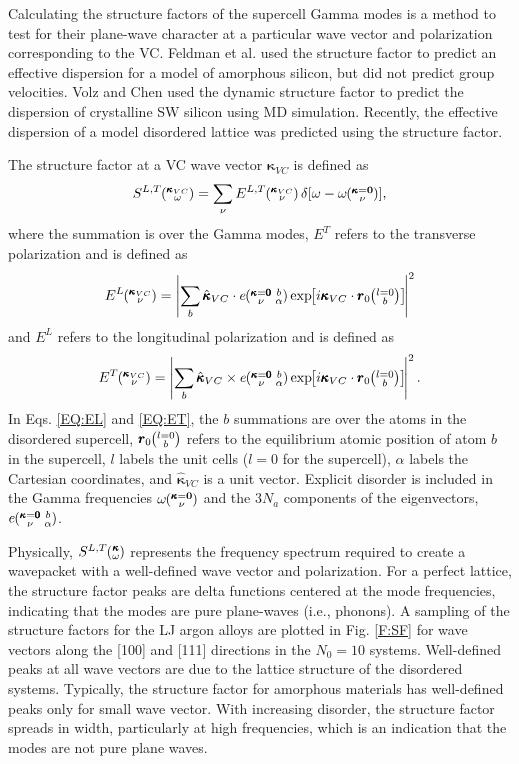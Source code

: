 \documentclass[12pt,twocolumn,iop]{/usr/share/texmf/tex/latex/iop/iopart}[/usr/share/texmf/tex/latex/iop/]
\newcommand{\EXP}[1]{\exp\mspace{-5.0mu}\left[#1\right]\mspace{-3.0mu}}
\newcommand{\ab}[2]{\mspace{-4.0mu}\left(\mspace{-8.0mu}
\begin{smallmatrix}&\ifthenelse{\equal{#1}{}}{a}{#1} \\&\ifthenelse
{\equal{#2}{}}{b}{#2}\end{smallmatrix}\mspace{-3.0mu}\right)}
\newcommand{\kgvba}{\mspace{-4.0mu}\left(\mspace{-8.0mu}
\begin{smallmatrix} &\pmb{\kappa}=\pmb{0} &b \\ &\nu 
&\alpha\end{smallmatrix}\mspace{-3.0mu}\right)}
\newcommand{\kvcv}{\mspace{-4.0mu}\left(\mspace{-8.0mu}
\begin{smallmatrix}&\pmb{\kappa}_{VC} \\&\nu\end{smallmatrix}
\mspace{-3.0mu}\right)}
\newcommand{\kgv}{\mspace{-4.0mu}\left(\mspace{-8.0mu}
\begin{smallmatrix}&\pmb{\kappa}=\mathbf{0} \\&\nu\end{smallmatrix}
\mspace{-3.0mu}\right)}
\newcommand{\kw}{\mspace{-4.0mu}\left(\mspace{-8.0mu}
\begin{smallmatrix}&\pmb{\kappa} \\&\omega\end{smallmatrix}
\mspace{-3.0mu}\right)}
\newcommand{\kvcw}{\mspace{-4.0mu}\left(\mspace{-8.0mu}
\begin{smallmatrix}&\pmb{\kappa}_{VC} \\&\omega\end{smallmatrix}
\mspace{-3.0mu}\right)}
\begin{document}
Calculating the structure factors of the supercell Gamma   
modes is a method to test for their plane-wave 
character at a particular wave vector and 
polarization corresponding to the VC. 
\cite{allen_diffusons_1999,feldman_numerical_1999} 
Feldman et al. used the structure factor to predict an effective 
dispersion for a model of amorphous silicon, but did not predict 
group velocities.\cite{feldman_numerical_1999} 
Volz and Chen used the dynamic structure factor to predict the
dispersion of crystalline SW silicon using MD simulation.
\cite{volz_molecular-dynamics_2000} Recently, the effective dispersion 
of a model disordered lattice was predicted using the structure factor.
\cite{beltukov_ioffe_2013}

The structure factor at a VC wave vector 
$\pmb{\kappa}_{VC}$ is defined as\cite{allen_diffusons_1999} 
\begin{equation}\label{EQ:SLT}
S^{L,T}\kvcw = 
\sum_{\nu} E^{L,T}\kvcv
\delta [\omega-\omega\kgv],
\end{equation}
where the summation is over the Gamma modes, $E^{T}$ refers 
to the transverse polarization and is defined as
\begin{equation}\label{EQ:EL}
E^L\kvcv = 
\left|
\sum_{b} 
\hat{\pmb{\kappa}}_{VC} \cdot e\kgvba 
\EXP{i\pmb{\kappa}_{VC}\cdot\pmb{r}_0\ab{l=0}{b}} 
\right|^2
\end{equation}
and $E^{L}$ refers to the longitudinal polarization and is defined as
\begin{equation}\label{EQ:ET}
E^T\kvcv = 
\left|
\sum_{b} 
\hat{\pmb{\kappa}}_{VC} \times e\kgvba 
\EXP{i\pmb{\kappa}_{VC}\cdot\pmb{r}_0\ab{l=0}{b}} 
\right|^2.
\end{equation}
In Eqs. \eqref{EQ:EL} and \eqref{EQ:ET}, the $b$ summations are 
over the atoms in the disordered supercell, 
$\pmb{r}_0\ab{l=0}{b}$ refers to the equilibrium atomic position of 
atom $b$ in the supercell, $l$ labels the unit cells 
($l=0$ for the supercell), 
$\alpha$ labels the Cartesian coordinates, and 
$\hat{\pmb{\kappa}}_{VC}$ is a unit vector.  
Explicit disorder is included in the Gamma frequencies 
$\omega\kgv$ and the $3N_a$ components of the eigenvectors, $e\kgvba$.

Physically, $S^{L,T}\kw$ represents  
the frequency spectrum required to create a wavepacket with a 
well-defined wave vector and polarization.
\cite{allen_diffusons_1999,feldman_numerical_1999,green_density_2011} 
For a perfect lattice, the 
structure factor peaks are delta functions centered at the mode 
frequencies, indicating that the modes are pure plane-waves 
(i.e., phonons). 
A sampling of the structure factors for the LJ argon alloys 
are plotted in Fig. \ref{F:SF} for wave vectors along the [100] and [111] 
directions in the $N_0=10$ systems.\cite{vc_fn1}  
Well-defined peaks 
at all wave vectors are due to the 
lattice structure of the disordered systems. 
Typically, the structure factor for amorphous materials has well-defined 
peaks only for small wave vector.
\cite{allen_diffusons_1999,feldman_numerical_1999} 
With increasing disorder, the structure factor spreads in width,  
particularly at high frequencies, which is an indication that the 
modes are not pure plane waves. 
\end{document}
